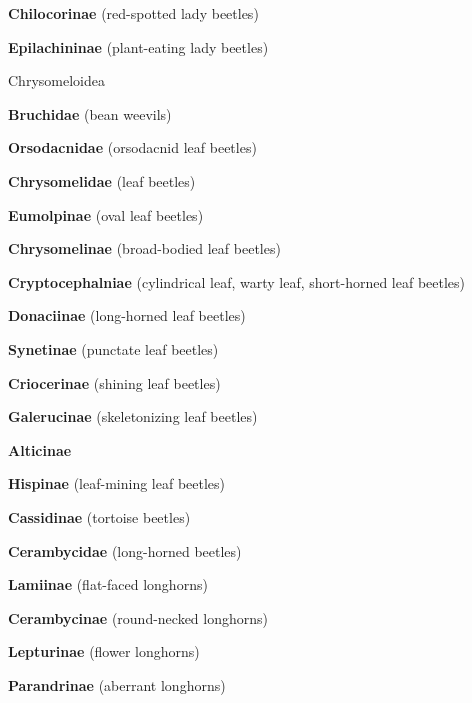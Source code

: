 \documentclass[letterpaper,10pt]{article}
\begin{document}
{\makebox[0.8cm]{}  \textbf{Chilocorinae} (red-spotted lady beetles) \par
\makebox[0.8cm]{}  \textbf{Epilachininae} (plant-eating lady beetles) \par
\makebox[0.40cm]{}  Chrysomeloidea \par
\makebox[0.6cm]{}  \textbf{Bruchidae} (bean weevils) \par
\makebox[0.6cm]{}  \textbf{Orsodacnidae} (orsodacnid leaf beetles) \par
\makebox[0.6cm]{}  \textbf{Chrysomelidae} (leaf beetles) \par
\makebox[0.8cm]{}  \textbf{Eumolpinae} (oval leaf beetles) \par
\makebox[0.8cm]{}  \textbf{Chrysomelinae} (broad-bodied leaf beetles) \par
\makebox[0.8cm]{}  \textbf{Cryptocephalniae} (cylindrical leaf, warty leaf, short-horned leaf beetles) \par
\makebox[0.8cm]{}  \textbf{Donaciinae} (long-horned leaf beetles) \par
\makebox[0.8cm]{}  \textbf{Synetinae} (punctate leaf beetles) \par
\makebox[0.8cm]{}  \textbf{Criocerinae} (shining leaf beetles) \par
\makebox[0.8cm]{}  \textbf{Galerucinae} (skeletonizing leaf beetles) \par
\makebox[0.8cm]{}  \textbf{Alticinae} \par
\makebox[0.8cm]{}  \textbf{Hispinae} (leaf-mining leaf beetles) \par
\makebox[0.8cm]{}  \textbf{Cassidinae} (tortoise beetles) \par
\makebox[0.6cm]{}  \textbf{Cerambycidae} (long-horned beetles) \par
\makebox[0.8cm]{}  \textbf{Lamiinae} (flat-faced longhorns) \par
\makebox[0.8cm]{}  \textbf{Cerambycinae} (round-necked longhorns) \par
\makebox[0.8cm]{}  \textbf{Lepturinae} (flower longhorns) \par
\makebox[0.8cm]{}  \textbf{Parandrinae} (aberrant longhorns) \par
}
\end{document}
